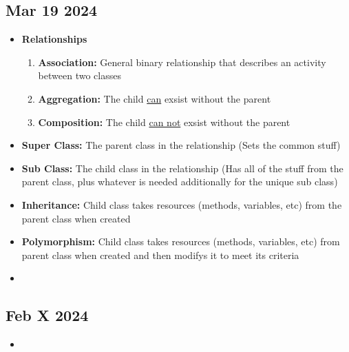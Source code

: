 \documentclass[12pt]{article}
\begin{document}
\subsection*{Mar 19 2024}

\begin{itemize}
		  \item \textbf{Relationships}
		  \begin{enumerate}
		  		\item \textbf{Association:} General binary relationship that describes
					an activity between two classes
				\item \textbf{Aggregation:} The child \underline{can} exsist without the parent 
				\item \textbf{Composition:} The child \underline{can not} exsist without the parent
		  \end{enumerate}
		  \item \textbf{Super Class:} The parent class in the relationship (Sets the common stuff)
		  \item \textbf{Sub Class:} The child class in the relationship (Has all of the stuff from the
				parent class, plus whatever is needed additionally for the unique sub class)
		  \item \textbf{Inheritance:} Child class takes resources (methods, variables, etc) from the parent class when created
		  \item \textbf{Polymorphism:} Child class takes resources (methods, variables, etc) from parent class when created and then 
		  		modifys it to meet its criteria
		  \item 
\end{itemize}

\subsection*{Feb X 2024}

\begin{itemize}
		  \item 
\end{itemize}
\end{document}
